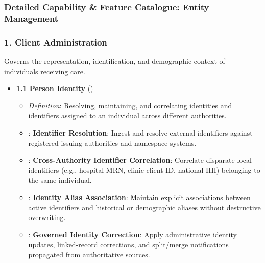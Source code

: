 \label{rad:enabling:110}
\subsubsection*{Detailed Capability \& Feature Catalogue: Entity Management}
\label{rad:enabling:112}
\subsubsection*{1. Client Administration}
\label{rad:enabling:113}

Governs the representation, identification, and demographic context of individuals receiving care.

\label{rad:enabling:115}

\begin{itemize}

\item 
\textbf{1.1 Person Identity} (\texttt{})


\begin{itemize}

\item 
\emph{Definition}: Resolving, maintaining, and correlating identities and identifiers assigned to an individual across different authorities.



\item 
\texttt{}: \textbf{Identifier Resolution}: Ingest and resolve external identifiers against registered issuing authorities and namespace systems.



\item 
\texttt{}: \textbf{Cross-Authority Identifier Correlation}: Correlate disparate local identifiers (e.g., hospital MRN, clinic client ID, national IHI) belonging to the same individual.



\item 
\texttt{}: \textbf{Identity Alias Association}: Maintain explicit associations between active identifiers and historical or demographic aliases without destructive overwriting.



\item 
\texttt{}: \textbf{Governed Identity Correction}: Apply administrative identity updates, linked-record corrections, and split/\allowbreak{}merge notifications propagated from authoritative sources.




\end{itemize}
\end{itemize}
